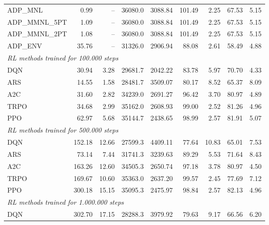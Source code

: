 \begin{samepage}
\begin{center}
\begin{tabular}{l|rr|rr|rr|rr}
    \midrule
    ADP\_MNL     &     0.99 &    -- &    36080.0 &    3088.84 &  101.49 &    2.25 &   67.53 &    5.15 \\
    ADP\_MMNL\_5PT &     1.09 &    -- &    36080.0 &    3088.84 &  101.49 &    2.25 &   67.53 &    5.15 \\
    ADP\_MMNL\_2PT &     1.08 &    -- &    36080.0 &    3088.84 &  101.49 &    2.25 &   67.53 &    5.15 \\
    ADP\_ENV     &    35.76 &    -- &    31326.0 &    2906.94 &   88.08 &    2.61 &   58.49 &    4.88 \\
    \midrule
    \multicolumn{9}{l}{\textit{RL methods trained for 100.000 steps}} \\
    \midrule
    DQN          &    30.94 &     3.28 &    29681.7 &    2042.22 &   83.78 &    5.97 &   70.70 &    4.33 \\
    ARS          &    14.55 &     1.58 &    28481.7 &    3509.07 &   80.17 &    8.52 &   65.37 &    8.09 \\
    A2C          &    31.60 &     2.82 &    34239.0 &    2691.27 &   96.42 &    3.70 &   80.97 &    4.89 \\
    TRPO         &    34.68 &     2.99 &    35162.0 &    2608.93 &   99.00 &    2.52 &   81.26 &    4.96 \\
    PPO          &    62.97 &     5.68 &    35144.7 &    2438.65 &   98.99 &    2.57 &   81.91 &    5.07 \\
    \midrule
    \multicolumn{9}{l}{\textit{RL methods trained for 500.000 steps}} \\
    \midrule
    DQN          &   152.18 &    12.66 &    27599.3 &    4409.11 &   77.64 &   10.83 &   65.01 &    7.53 \\
    ARS          &    73.14 &     7.44 &    31741.3 &    3239.63 &   89.29 &    5.53 &   71.64 &    8.43 \\
    A2C          &   163.26 &    12.60 &    34505.3 &    2650.74 &   97.18 &    3.78 &   80.97 &    4.50 \\
    TRPO         &   169.67 &    10.60 &    35363.0 &    2637.20 &   99.57 &    2.45 &   77.69 &    7.12 \\
    PPO          &   300.18 &    15.15 &    35095.3 &    2475.97 &   98.84 &    2.57 &   82.13 &    4.96 \\
    \midrule
    \multicolumn{9}{l}{\textit{RL methods trained for 1.000.000 steps}} \\
    \midrule
    DQN          &   302.70 &    17.15 &    28288.3 &    3979.92 &   79.63 &    9.17 &   66.56 &    6.20 \\

\end{tabular}
\end{center}
\end{samepage}
